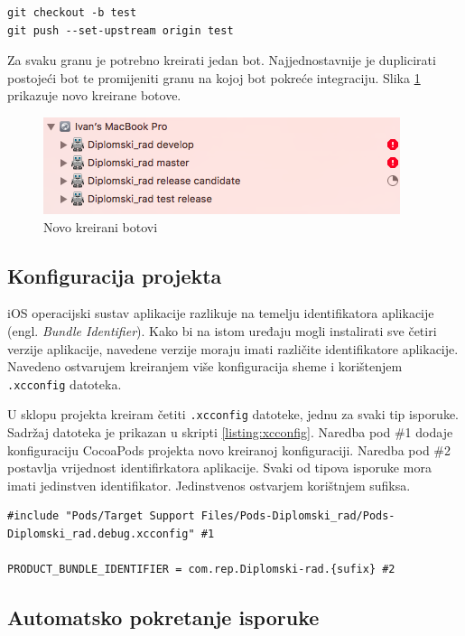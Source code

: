 \documentclass[times, utf8, diplomski, numeric]{fer}
\newcommand{\eng}[1]{(engl. \textit{#1})}
\begin{document}
\begin{appendices}
\begin{lstlisting}[caption=Kreiranje potrebnih grana Gitflow radnog toka, label=listing:git_branch_creation]
git checkout -b test
git push --set-upstream origin test
\end{lstlisting}

Za svaku granu je potrebno kreirati jedan bot. Najjednostavnije je duplicirati postojeći bot te promijeniti granu na kojoj bot pokreće integraciju. Slika \ref{fig:MultipleBots} prikazuje novo kreirane botove.

\begin{figure}
\centering
\includegraphics[scale=0.7]{MultipleBots}
\caption{Novo kreirani botovi}
\label{fig:MultipleBots}
\end{figure}

\subsection{Konfiguracija projekta}

iOS operacijski sustav aplikacije razlikuje na temelju identifikatora aplikacije \eng{Bundle Identifier}. Kako bi na istom uređaju mogli instalirati sve četiri verzije aplikacije, navedene verzije moraju imati različite identifikatore aplikacije. Navedeno ostvarujem kreiranjem više konfiguracija sheme i korištenjem \verb|.xcconfig| datoteka.

U sklopu projekta kreiram četiti \verb|.xcconfig| datoteke, jednu za svaki tip isporuke. Sadržaj datoteka je prikazan u skripti \ref{listing:xcconfig}. Naredba pod \#1 dodaje konfiguraciju CocoaPods projekta novo kreiranoj konfiguraciji. Naredba pod \#2 postavlja vrijednost identifirkatora aplikacije. Svaki od tipova isporuke mora imati jedinstven identifikator. Jedinstvenos ostvarjem korištnjem sufiksa.

\begin{lstlisting}[caption=Sadržaj .xcconfig datoteke, label=listing:xcconfig]
#include "Pods/Target Support Files/Pods-Diplomski_rad/Pods-Diplomski_rad.debug.xcconfig" #1

PRODUCT_BUNDLE_IDENTIFIER = com.rep.Diplomski-rad.{sufix} #2
\end{lstlisting}

\subsection{Automatsko pokretanje isporuke}


\end{appendices}
\end{document}
